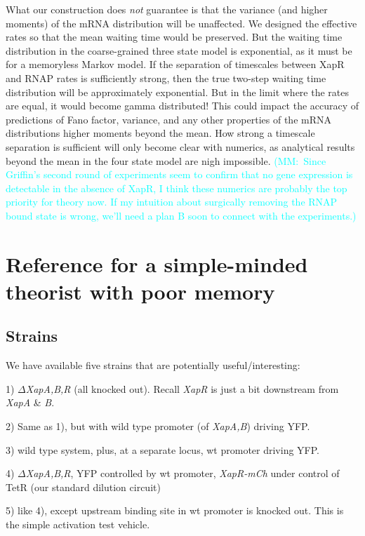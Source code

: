 \documentclass[12pt]{article}%
\newcommand{\mmnote}[1]{\textcolor{cyan}{(MM:~#1)}}
\begin{document}
What our construction does \textit{not} guarantee is that the variance
(and higher moments) of the mRNA distribution will be unaffected.
We designed the effective rates so that the mean waiting time would be preserved.
But the waiting time distribution in the coarse-grained three state model
is exponential, as it must be for a memoryless Markov model.
If the separation of timescales between XapR and RNAP rates is sufficiently strong,
then the true two-step waiting time distribution will be approximately exponential.
But in the limit where the rates are equal, it would become gamma distributed!
This could impact the accuracy of predictions of Fano factor, variance,
and any other properties of the mRNA distributions higher moments beyond the mean.
How strong a timescale separation is sufficient will only become clear with numerics,
as analytical results beyond the mean in the four state model are nigh impossible.
\mmnote{Since Griffin's second round of experiments seem to confirm that
no gene expression is detectable in the absence of XapR,
I think these numerics are probably the top priority for theory now.
If my intuition about surgically removing the RNAP bound state is wrong,
we'll need a plan B soon to connect with the experiments.}

\appendix

\section{Reference for a simple-minded theorist with poor memory}

\subsection{Strains}
We have available five strains that are potentially useful/interesting:

1) $\Delta$\textit{XapA,B,R} (all knocked out).
Recall \textit{XapR} is just a bit downstream from \textit{XapA} \& \textit{B}.

2) Same as 1), but with wild type promoter (of \textit{XapA,B}) driving YFP.

3) wild type system, plus, at a separate locus, wt promoter driving YFP.

4) $\Delta$\textit{XapA,B,R}, YFP controlled by wt promoter,
\textit{XapR-mCh} under control of TetR (our standard dilution circuit)

5) like 4), except upstream binding site in wt promoter is knocked out.
This is the simple activation test vehicle.

\appendix



% 

\end{document}
